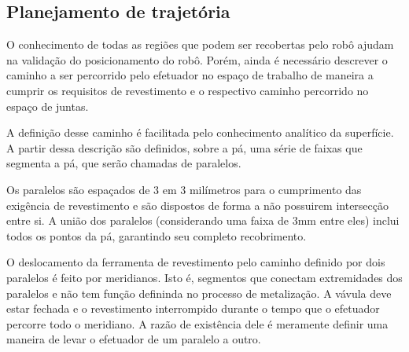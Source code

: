 \subsection{Planejamento de trajetória}

O conhecimento de todas as regiões que podem ser recobertas pelo robô ajudam na
validação do posicionamento do robô. Porém, ainda é necessário descrever o
caminho a ser percorrido pelo efetuador no espaço de trabalho de maneira a
cumprir os requisitos de revestimento e o respectivo caminho percorrido no espaço de juntas.

A definição desse caminho é facilitada pelo conhecimento analítico da
superfície. A partir dessa descrição são definidos, sobre a pá, uma série
de faixas que segmenta a pá, que serão chamadas de
paralelos.

Os paralelos são espaçados de 3 em 3 milímetros para o cumprimento das exigência
de revestimento e são dispostos de forma a não possuirem intersecção entre si. A
união dos paralelos (considerando uma faixa de 3mm entre eles) inclui todos os
pontos da pá, garantindo seu completo recobrimento.

O deslocamento da ferramenta de revestimento  pelo caminho definido por dois
paralelos é feito por meridianos. Isto é, segmentos que
conectam extremidades dos paralelos e não tem função defininda no processo de
metalização. A vávula deve estar fechada e o revestimento interrompido
durante o tempo que o efetuador percorre todo o meridiano. A razão de existência
dele é meramente definir uma maneira de levar o efetuador de um paralelo a
outro.




